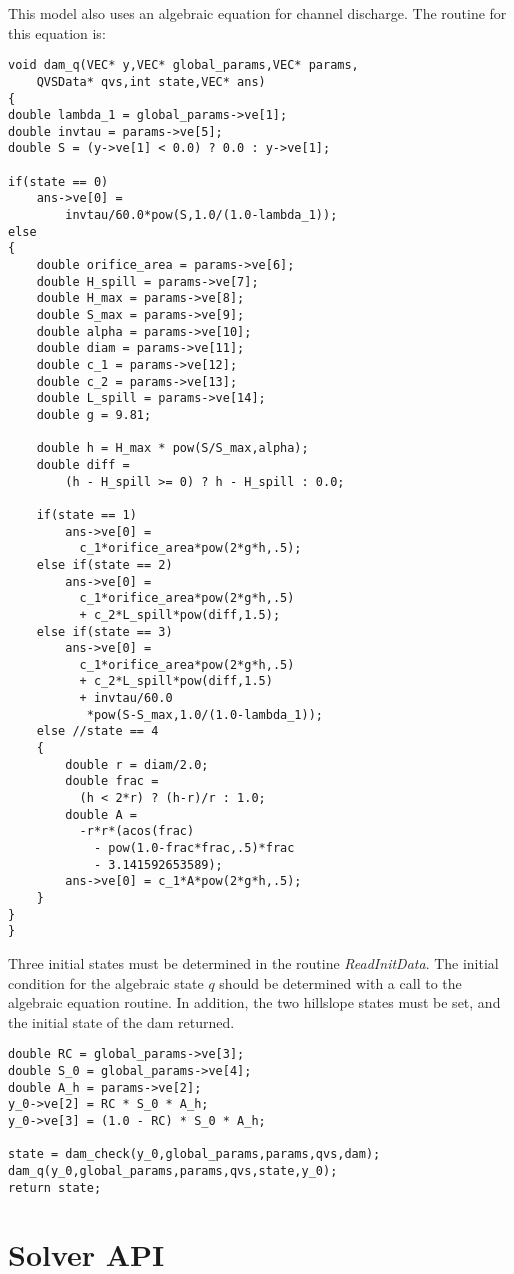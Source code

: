 \documentclass[12pt]{article}
\begin{document}
This model also uses an algebraic equation for channel discharge. The routine for this equation is:
\begin{lstlisting}[style=CStyle]
void dam_q(VEC* y,VEC* global_params,VEC* params,
	QVSData* qvs,int state,VEC* ans)
{
double lambda_1 = global_params->ve[1];
double invtau = params->ve[5];
double S = (y->ve[1] < 0.0) ? 0.0 : y->ve[1];

if(state == 0)
	ans->ve[0] = 
	    invtau/60.0*pow(S,1.0/(1.0-lambda_1));
else
{
	double orifice_area = params->ve[6];
	double H_spill = params->ve[7];
	double H_max = params->ve[8];
	double S_max = params->ve[9];
	double alpha = params->ve[10];
	double diam = params->ve[11];
	double c_1 = params->ve[12];
	double c_2 = params->ve[13];
	double L_spill = params->ve[14];
	double g = 9.81;

	double h = H_max * pow(S/S_max,alpha);
	double diff = 
	    (h - H_spill >= 0) ? h - H_spill : 0.0;

	if(state == 1)
		ans->ve[0] = 
		  c_1*orifice_area*pow(2*g*h,.5);
	else if(state == 2)
		ans->ve[0] = 
		  c_1*orifice_area*pow(2*g*h,.5)
		  + c_2*L_spill*pow(diff,1.5);
	else if(state == 3)
		ans->ve[0] = 
		  c_1*orifice_area*pow(2*g*h,.5) 
		  + c_2*L_spill*pow(diff,1.5) 
		  + invtau/60.0
		   *pow(S-S_max,1.0/(1.0-lambda_1));
	else //state == 4
	{
		double r = diam/2.0;
		double frac = 
		  (h < 2*r) ? (h-r)/r : 1.0;
		double A = 
		  -r*r*(acos(frac) 
		    - pow(1.0-frac*frac,.5)*frac
		    - 3.141592653589);
		ans->ve[0] = c_1*A*pow(2*g*h,.5);
	}
}
}
\end{lstlisting}
Three initial states must be determined in the routine \emph{ReadInitData}. The initial condition for the algebraic state $q$ should be determined with a call to the algebraic equation routine. In addition, the two hillslope states must be set, and the initial state of the dam returned.
\begin{lstlisting}[style=CStyle]
double RC = global_params->ve[3];
double S_0 = global_params->ve[4];
double A_h = params->ve[2];
y_0->ve[2] = RC * S_0 * A_h;
y_0->ve[3] = (1.0 - RC) * S_0 * A_h;

state = dam_check(y_0,global_params,params,qvs,dam); 
dam_q(y_0,global_params,params,qvs,state,y_0);
return state;
\end{lstlisting}


\section{Solver API} \label{sec: solver api}
\end{document}
